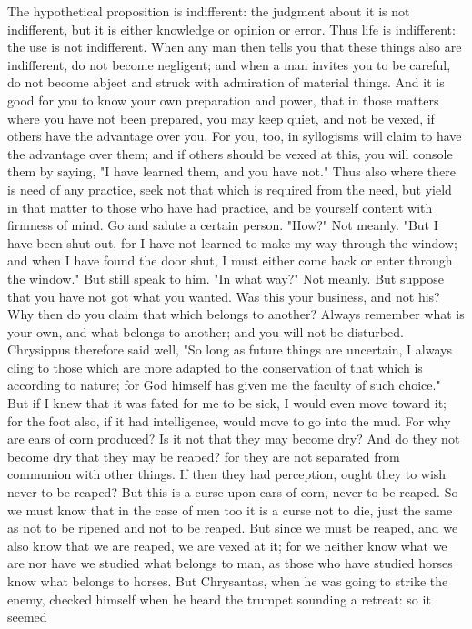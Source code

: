 \documentclass[a4paper]{article}
\begin{document}
    The hypothetical proposition is indifferent: the judgment about it is not
indifferent, but it is either knowledge or opinion or error. Thus life is
indifferent: the use is not indifferent. When any man then tells you that these
things also are indifferent, do not become negligent; and when a man invites
you to be careful, do not become abject and struck with admiration of material
things. And it is good for you to know your own preparation and power, that in
those matters where you have not been prepared, you may keep quiet, and not be
vexed, if others have the advantage over you. For you, too, in syllogisms will
claim to have the advantage over them; and if others should be vexed at this,
you will console them by saying, "I have learned them, and you have not." Thus
also where there is need of any practice, seek not that which is required from
the need, but yield in that matter to those who have had practice, and be
yourself content with firmness of mind.
    Go and salute a certain person. "How?" Not meanly. "But I have been shut
out, for I have not learned to make my way through the window; and when I have
found the door shut, I must either come back or enter through the window." But
still speak to him. "In what way?" Not meanly. But suppose that you have not
got what you wanted. Was this your business, and not his? Why then do you claim
that which belongs to another? Always remember what is your own, and what
belongs to another; and you will not be disturbed. Chrysippus therefore said
well, "So long as future things are uncertain, I always cling to those which
are more adapted to the conservation of that which is according to nature; for
God himself has given me the faculty of such choice." But if I knew that it was
fated for me to be sick, I would even move toward it; for the foot also, if it
had intelligence, would move to go into the mud. For why are ears of corn
produced? Is it not that they may become dry? And do they not become dry that
they may be reaped? for they are not separated from communion with other
things. If then they had perception, ought they to wish never to be reaped? But
this is a curse upon ears of corn, never to be reaped. So we must know that in
the case of men too it is a curse not to die, just the same as not to be
ripened and not to be reaped. But since we must be reaped, and we also know
that we are reaped, we are vexed at it; for we neither know what we are nor
have we studied what belongs to man, as those who have studied horses know what
belongs to horses. But Chrysantas, when he was going to strike the enemy,
checked himself when he heard the trumpet sounding a retreat: so it seemed
\end{document}
